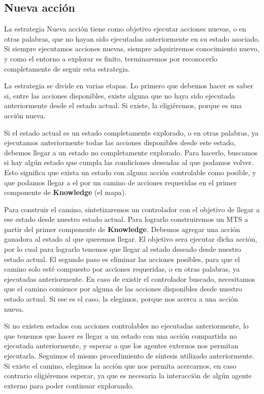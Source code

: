 \subsection{Nueva acción}

La estrategia Nueva acción tiene como objetivo ejecutar acciones nuevas, o en otras palabras, que no hayan sido ejecutadas anteriormente en su estado asociado.
Si siempre ejecutamos acciones nuevas, siempre adquiriremos conocimiento nuevo, y como el entorno a explorar es finito, terminaremos por reconocerlo completamente
de seguir esta estrategia.

\vspace{\baselineskip}
La estrategia se divide en varias etapas. Lo primero que debemos hacer es saber si, entre las acciones disponibles, existe alguna que no haya sido ejecutada
anteriormente desde el estado actual. Si existe, la eligiéremos, porque es una acción nueva.

\vspace{\baselineskip}
Si el estado actual es un estado completamente explorado, o en otras palabras, ya ejecutamos anteriormente todas las acciones disponibles desde este estado, debemos
llegar a un estado no completamente explorado. Para hacerlo, buscamos si hay algún estado que cumpla las condiciones deseadas al que podamos volver. Esto
significa que exista un estado con alguna acción controlable como posible, y que podamos llegar a el por un camino de acciones requeridas en el primer componente
de \textbf{Knowledge} (el mapa).

\vspace{\baselineskip}
Para construir el camino, sintetizaremos un controlador con el objetivo de llegar a ese estado desde nuestro estado actual. Para lograrlo construiremos un MTS
a partir del primer componente de \textbf{Knowledge}. Debemos agregar una acción ganadora al estado al que queremos llegar. El objetivo sera ejecutar dicha acción,
por lo cual para lograrlo tenemos que llegar al estado deseado desde nuestro estado actual. El segundo paso es eliminar las acciones posibles, para que el camino
solo esté compuesto por acciones requeridas, o en otras palabras, ya ejecutadas anteriormente. En caso de existir el controlador buscado, necesitamos que el camino
comience por alguna de las acciones disponibles desde nuestro estado actual. Si ese es el caso, la elegimos, porque nos acerca a una acción nueva.

\vspace{\baselineskip}
Si no existen estados con acciones controlables no ejecutadas anteriormente, lo que tenemos que hacer es llegar a un estado con una acción compartida no ejecutada
anteriormente, y esperar a que los agentes externos nos permitan ejecutarla. Seguimos el mismo procedimiento de síntesis utilizado anteriormente. Si existe el camino,
elegimos la acción que nos permita acercarnos, en caso contrario eligiéremos esperar, ya que es necesaria la interacción de algún agente externo para poder continuar
explorando.

